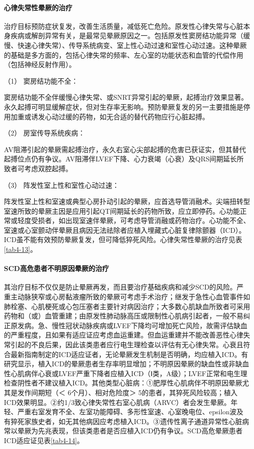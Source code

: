 \paragraph{心律失常性晕厥的治疗}

治疗目标预防症状复发，改善生活质量，减低死亡危险。原发性心律失常与心脏本身疾病或解剖异常有关，是最常见晕厥原因之一。包括原发性窦房结功能异常（缓慢、快速心律失常）、传导系统病变、室上性心动过速和室性心动过速。这种晕厥的基础是多方面的，包括心律失常的频率、左心室的功能状态和血管的代偿作用（包括神经反射作用）。

\hypertarget{text00014.htmlux5cux23CHP1-4-4-1-3-1}{}
（1） 窦房结功能不全：

窦房结功能不全伴缓慢心律失常、或SNRT异常引起的晕厥，起搏治疗效果显著。永久起搏可明显缓解症状，但对生存率无影响。预防晕厥复发的另一主要措施是停用加重或诱发心动过缓的药物，如无合适的替代药物应行心脏起搏。

\hypertarget{text00014.htmlux5cux23CHP1-4-4-1-3-2}{}
（2） 房室传导系统疾病：

AV阻滞引起的晕厥需起搏治疗，永久右室心尖部起搏的危害已获证实，但其替代起搏位点仍有争议。AV阻滞伴LVEF下降、心力衰竭（心衰）及QRS间期延长所致者可考虑双腔起搏。

\hypertarget{text00014.htmlux5cux23CHP1-4-4-1-3-3}{}
（3） 阵发性室上性和室性心动过速：

阵发性室上性和室速或典型心房扑动引起的晕厥，应首选导管消融术。尖端扭转型室速所致的晕厥主因是应用引起QT间期延长的药物所致，应立即停药。心功能正常或轻度受损者，如出现室速伴晕厥，可考虑导管消融或药物治疗。心功能不全、室速或心室颤动伴晕厥且病因无法祛除者应植入埋藏式心脏复律除颤器（ICD）。ICD虽不能有效预防晕厥复发，但可降低猝死风险。心律失常性晕厥的治疗见表\ref{tab4-13}。

\paragraph{SCD高危患者不明原因晕厥的治疗}

其治疗目标不仅仅是防止晕厥再发，而且要治疗基础疾病和减少SCD的风险。严重主动脉狭窄或心房黏液瘤所致的晕厥可考虑手术治疗；继发于急性心血管事件如肺栓塞、心肌梗死或心包压塞者主要针对病因治疗；大多数心肌缺血所致者可采用药物和（或）血管重建；由原发性肺动脉高压或限制性心肌病引起者，一般不易纠正原发病。急、慢性冠状动脉疾病或LVEF下降均可增加死亡风险，故需评估缺血的严重程度，且如果有适应证应考虑血运重建。但血运重建并不能改善恶性心律失常引起的不良后果，因此该类患者应行电生理检查以评估有无心律失常。心衰且符合最新指南制定的ICD适应证者，无论晕厥发生机制是否明确，均应植入ICD。有研究显示，植入ICD的晕厥患者生存率明显增加；不明原因晕厥的缺血性或非缺血性心肌病伴心衰或LVEF严重下降者应植入ICD（Ⅰ类，A级）；LVEF正常和电生理检查阴性者不建议植入ICD。其他类型心脏病：①肥厚性心肌病伴不明原因晕厥尤其是发作间期短（＜
6个月）、相对危险度＞
5的患者，其猝死风险较高；植入ICD效果明显。②约1/3致心律失常性右室心肌病（ARVC）者会发生晕厥。年轻、严重右室发育不全、左室功能障碍、多形性室速、心室晚电位、epsilon波及有猝死家族史者，如无其他病因应考虑植入ICD。③遗传性离子通道异常性心脏病常以晕厥为先兆表现，但该类患者是否应植入ICD仍有争议。SCD高危晕厥患者ICD适应证见表\ref{tab4-14}。

